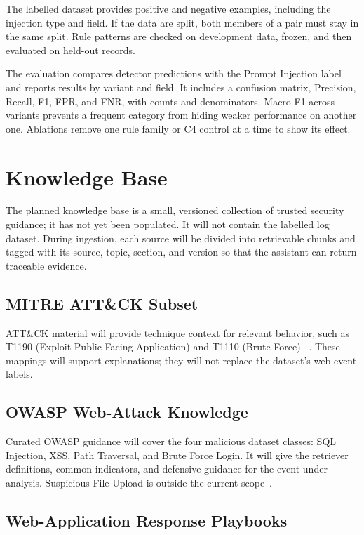 The labelled dataset provides positive and negative examples, including
the injection type and field. If the data are split, both members of a
pair must stay in the same split. Rule patterns are checked on development
data, frozen, and then evaluated on held-out records.

The evaluation compares detector predictions with the Prompt Injection
label and reports results by variant and field. It includes a confusion
matrix, Precision, Recall, F1, FPR, and FNR, with counts and denominators.
Macro-F1 across variants prevents a frequent category from hiding weaker
performance on another one. Ablations remove one rule family or C4
control at a time to show its effect.

\section{Knowledge Base}\label{system-knowledge-base}

The planned knowledge base is a small, versioned collection of trusted
security guidance; it has not yet been populated. It will not contain the
labelled log dataset. During ingestion,
each source will be divided into retrievable chunks and tagged with its
source, topic, section, and version so that the assistant can return
traceable evidence.

\subsection{MITRE ATT\&CK Subset}\label{mitre-attck-subset}

ATT\&CK material will provide technique context for relevant behavior,
such as T1190 (Exploit Public-Facing Application) and T1110 (Brute Force)
~\cite{mitre2025attack}. These mappings will support explanations; they
will not replace the dataset's web-event labels.

\subsection{OWASP Web-Attack
Knowledge}\label{owasp-web-attack-knowledge}

Curated OWASP guidance will cover the four malicious dataset classes:
SQL Injection, XSS, Path Traversal, and Brute Force Login. It will give
the retriever definitions, common indicators, and defensive guidance for
the event under analysis. Suspicious File Upload is outside the current
scope~\cite{owasp2025llmtop10}.

\subsection{Web-Application Response
Playbooks}\label{web-application-response-playbooks}

